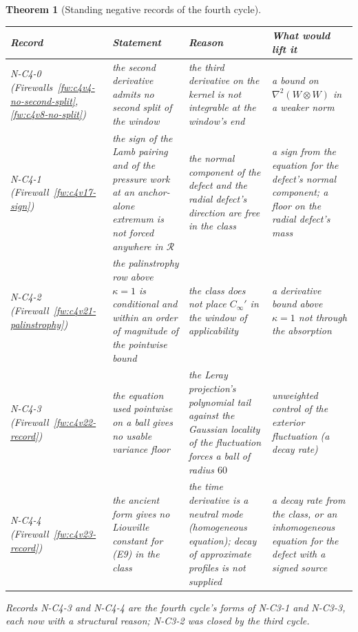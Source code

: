 \documentclass[11pt]{article}
\theoremstyle{plain}
\newtheorem{theorem}{Theorem}[section]
\theoremstyle{definition}
\theoremstyle{remark}
\begin{document}
\begin{theorem}[Standing negative records of the fourth cycle]
\label{thm:c4v24-records}
\medskip
\begin{center}\small
\begin{tabular}{@{}p{}p{}p{}p{}@{}}
\toprule
\textbf{Record} & \textbf{Statement} & \textbf{Reason} & \textbf{What would lift it}\\
\midrule
N-C4-0 (Firewalls~\ref{fw:c4v4-no-second-split}, \ref{fw:c4v8-no-split}) &
 the second derivative admits no second split of the window &
 the third derivative on the kernel is not integrable at the window's end &
 a bound on \(\nabla^2(W\otimes W)\) in a weaker norm\\[3pt]
N-C4-1 (Firewall~\ref{fw:c4v17-sign}) &
 the sign of the Lamb pairing and of the pressure work at an anchor-alone extremum is not forced anywhere in \(\mathcal R\) &
 the normal component of the defect and the radial defect's direction are free in the class &
 a sign from the equation for the defect's normal component; a floor on the radial defect's mass\\[3pt]
N-C4-2 (Firewall~\ref{fw:c4v21-palinstrophy}) &
 the palinstrophy row above \(\kappa=1\) is conditional and within an order of magnitude of the pointwise bound &
 the class does not place \(C_\infty'\) in the window of applicability &
 a derivative bound above \(\kappa=1\) not through the absorption\\[3pt]
N-C4-3 (Firewall~\ref{fw:c4v22-record}) &
 the equation used pointwise on a ball gives no usable variance floor &
 the Leray projection's polynomial tail against the Gaussian locality of the fluctuation forces a ball of radius \(60\) &
 unweighted control of the exterior fluctuation (a decay rate)\\[3pt]
N-C4-4 (Firewall~\ref{fw:c4v23-record}) &
 the ancient form gives no Liouville constant for (E9) in the class &
 the time derivative is a neutral mode (homogeneous equation); decay of approximate profiles is not supplied &
 a decay rate from the class, or an inhomogeneous equation for the defect with a signed source\\
\bottomrule
\end{tabular}
\end{center}
\medskip
Records N-C4-3 and N-C4-4 are the fourth cycle's forms of N-C3-1 and
N-C3-3, each now with a structural reason; N-C3-2 was closed by the
third cycle.
\end{theorem}
\end{document}
